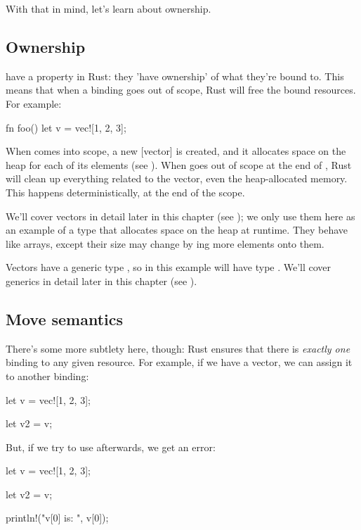 With that in mind, let's learn about ownership.

\subsection*{Ownership}

 have a property in Rust: they 'have ownership' of what they're bound to. This means that when 
a binding goes out of scope, Rust will free the bound resources. For example:

\begin{rustc}
fn foo() {
    let v = vec![1, 2, 3];
}
\end{rustc}

When  comes into scope, a new [vector] is created, and it allocates space on the heap for each of its elements 
(see ). When  goes out of scope at the end of , Rust will clean up 
everything related to the vector, even the heap-allocated memory. This happens deterministically, at the end of the scope.

\blank

We'll cover vectors in detail later in this chapter (see ); we only use them here as an example of a 
type that allocates space on the heap at runtime. They behave like arrays, except their size may change by ing more 
elements onto them.

\blank

Vectors have a generic type  , so in this example  will have type 
. We'll cover generics in detail later in this chapter (see ).

\subsection*{Move semantics}

There's some more subtlety here, though: Rust ensures that there is \emph{exactly one} binding to any given resource. For 
example, if we have a vector, we can assign it to another binding:

\begin{rustc}
let v = vec![1, 2, 3];

let v2 = v;
\end{rustc}

But, if we try to use  afterwards, we get an error:

\begin{rustc}
let v = vec![1, 2, 3];

let v2 = v;

println!("v[0] is: {}", v[0]);
\end{rustc}

